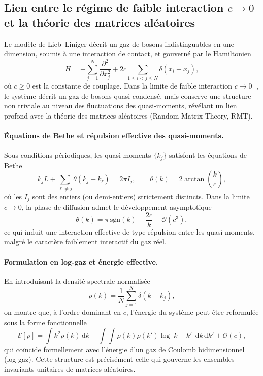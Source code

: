 \subsection{Lien entre le régime de faible interaction $c\to 0$ et la théorie des matrices aléatoires}

Le modèle de Lieb--Liniger décrit un gaz de bosons indistinguables en une dimension, soumis à une interaction de contact, et gouverné par le Hamiltonien
\begin{equation}
H = -\sum_{j=1}^N \frac{\partial^2}{\partial x_j^2}
+ 2c \sum_{1\le i<j\le N} \delta(x_i-x_j),
\end{equation}
où $c\ge 0$ est la constante de couplage.  
Dans la limite de faible interaction $c\to 0^+$, le système décrit un gaz de bosons quasi-condensé, mais conserve une structure non triviale au niveau des fluctuations des quasi-moments, révélant un lien profond avec la théorie des matrices aléatoires (Random Matrix Theory, RMT).

\paragraph{Équations de Bethe et répulsion effective des quasi-moments.}
Sous conditions périodiques, les quasi-moments $\{k_j\}$ satisfont les équations de Bethe
\begin{equation}
k_j L + \sum_{\ell\neq j} \theta(k_j-k_\ell) = 2\pi I_j,
\qquad
\theta(k)=2\arctan\!\left(\frac{k}{c}\right),
\end{equation}
où les $I_j$ sont des entiers (ou demi-entiers) strictement distincts.  
Dans la limite $c\to 0$, la phase de diffusion admet le développement asymptotique
\begin{equation}
\theta(k) = \pi\,\mathrm{sgn}(k) - \frac{2c}{k} + \mathcal O(c^3),
\end{equation}
ce qui induit une interaction effective de type répulsion entre les quasi-moments, malgré le caractère faiblement interactif du gaz réel.

\paragraph{Formulation en log-gaz et énergie effective.}
En introduisant la densité spectrale normalisée
\begin{equation}
\rho(k) = \frac{1}{N}\sum_{j=1}^N \delta(k-k_j),
\end{equation}
on montre que, à l’ordre dominant en $c$, l’énergie du système peut être reformulée sous la forme fonctionnelle
\begin{equation}
\mathcal E[\rho]
=
\int k^2 \rho(k)\,\mathrm dk
-
\int\!\!\int \rho(k)\rho(k')\log|k-k'|\,\mathrm dk\,\mathrm dk'
+
\mathcal O(c),
\end{equation}
qui coïncide formellement avec l’énergie d’un gaz de Coulomb bidimensionnel (log-gaz).  
Cette structure est précisément celle qui gouverne les ensembles invariants unitaires de matrices aléatoires.

